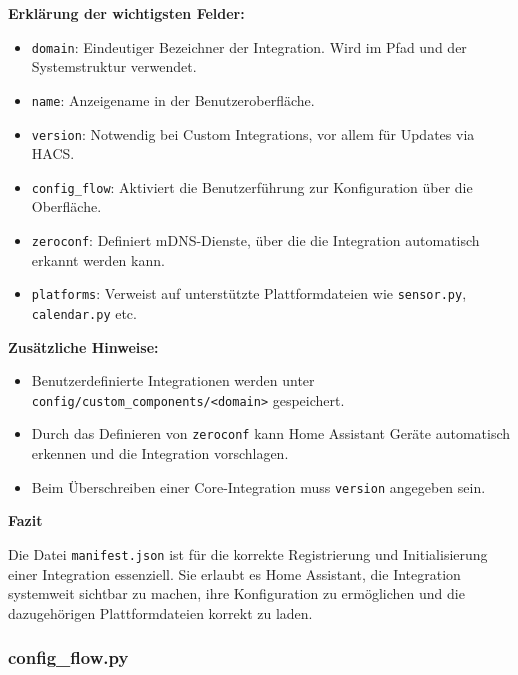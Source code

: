\textbf{Erklärung der wichtigsten Felder:}

\begin{itemize}
    \item \texttt{domain}: Eindeutiger Bezeichner der Integration. Wird im Pfad und der Systemstruktur verwendet.\\
    \item \texttt{name}: Anzeigename in der Benutzeroberfläche.\\
    \item \texttt{version}: Notwendig bei Custom Integrations, vor allem für Updates via HACS.\\
    \item \texttt{config\_flow}: Aktiviert die Benutzerführung zur Konfiguration über die Oberfläche.\\
    \item \texttt{zeroconf}: Definiert mDNS-Dienste, über die die Integration automatisch erkannt werden kann.\\
    \item \texttt{platforms}: Verweist auf unterstützte Plattformdateien wie \texttt{sensor.py}, \texttt{calendar.py} etc.
\end{itemize}

\vspace{1em}
\textbf{Zusätzliche Hinweise:}

\begin{itemize}
    \item Benutzerdefinierte Integrationen werden unter \texttt{config/custom\_components/<domain>} gespeichert.\\
    \item Durch das Definieren von \texttt{zeroconf} kann Home Assistant Geräte automatisch erkennen und die Integration vorschlagen.\\
    \item Beim Überschreiben einer Core-Integration muss \texttt{version} angegeben sein.
\end{itemize}

\vspace{1em}
\textbf{Fazit}

Die Datei \texttt{manifest.json} ist für die korrekte Registrierung und Initialisierung einer Integration essenziell. Sie erlaubt es Home Assistant, die Integration systemweit sichtbar zu machen, ihre Konfiguration zu ermöglichen und die dazugehörigen Plattformdateien korrekt zu laden.

\subsubsection{config\_flow.py}

